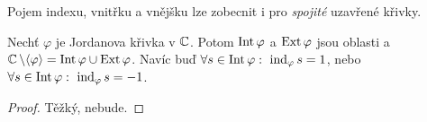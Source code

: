 \begin{note}
Pojem indexu, vnitřku a vnějšku lze zobecnit i pro \emph{spojité} uzavřené křivky.
\end{note}

\begin{theorem}[Jordanova]\label{thm:Jordan}
Nechť $\varphi$ je Jordanova křivka v $\operatorname{\mathbb{C}}$. Potom $\operatorname{Int}\varphi$ a $\operatorname{Ext}\varphi$ jsou oblasti a $\operatorname{\mathbb{C}}\setminus\langle\varphi\rangle=\operatorname{Int}\varphi\cup\operatorname{Ext}\varphi$. Navíc buď $\forall s \in \Int\varphi:\ \ind_\varphi s=1$, nebo $\forall s \in \operatorname{Int}\varphi:\ \operatorname{ind}_\varphi s=-1$.
\end{theorem}
\begin{proof}
Těžký, nebude.
\end{proof}